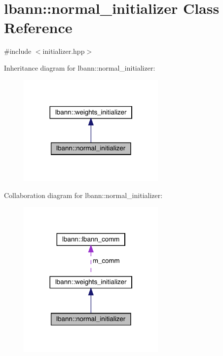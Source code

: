 \hypertarget{classlbann_1_1normal__initializer}{}\section{lbann\+:\+:normal\+\_\+initializer Class Reference}
\label{classlbann_1_1normal__initializer}


{\ttfamily \#include $<$initializer.\+hpp$>$}



Inheritance diagram for lbann\+:\+:normal\+\_\+initializer\+:\nopagebreak
\begin{figure}[H]
\begin{center}
\leavevmode
\includegraphics[width=204pt]{classlbann_1_1normal__initializer__inherit__graph}
\end{center}
\end{figure}


Collaboration diagram for lbann\+:\+:normal\+\_\+initializer\+:\nopagebreak
\begin{figure}[H]
\begin{center}
\leavevmode
\includegraphics[width=204pt]{classlbann_1_1normal__initializer__coll__graph}
\end{center}
\end{figure}
